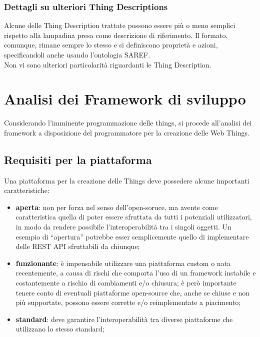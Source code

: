 \documentclass[12pt,a4paper,openright,oneside]{report}
\newcommand{\quotes}[1]{``#1''}
\begin{document}
\subsection{Dettagli su ulteriori Thing Descriptions}
Alcune delle Thing Description trattate possono essere più o meno semplici rispetto alla lampadina presa come descrizione di riferimento. Il formato, comunque, rimane sempre lo stesso e si definiscono proprietà e azioni, specificandoli anche usando l'ontologia SAREF.\\

Non vi sono ulteriori particolarità riguardanti le Thing Description.


\clearpage{\pagestyle{empty}\cleardoublepage}
\chapter{Analisi dei Framework di sviluppo}           %
\lhead[\fancyplain{}{\bfseries\thepage}]{\fancyplain{}{\bfseries\rightmark}}  

Considerando l'imminente programmazione delle things, si procede all'analisi dei framework a disposizione del programmatore per la creazione delle Web Things.

\section{Requisiti per la piattaforma}
\label{sec:iot_platform}
Una piattaforma per la creazione delle Things deve possedere alcune importanti caratteristiche:

\begin{itemize}
	\setlength\itemsep{0em}
	\item \textbf{aperta}: non per forza nel senso dell'open-soruce, ma avente come caratteristica quella di poter essere sfruttata da tutti i potenziali utilizzatori, in modo da rendere possibile l'interoperabilità tra i singoli oggetti. Un esempio di \quotes{apertura} potrebbe esser semplicemente quello di implementare delle REST API sfruttabili da chiunque;

	\item \textbf{funzionante}: è impensabile utilizzare una piattaforma custom o nata recentemente, a causa di rischi che comporta l'uso di un framework instabile e costantemente a rischio di cambiamenti e/o chiusura; è però importante tenere conto di eventuali piattaforme open-source che, anche se chiuse e non più supportate, possono essere corrette e/o reimplementate a piacimento;
	
	\item \textbf{standard}: deve garantire l'interoperabilità tra diverse piattaforme che utilizzano lo stesso standard;
\end{itemize}
\end{document}
